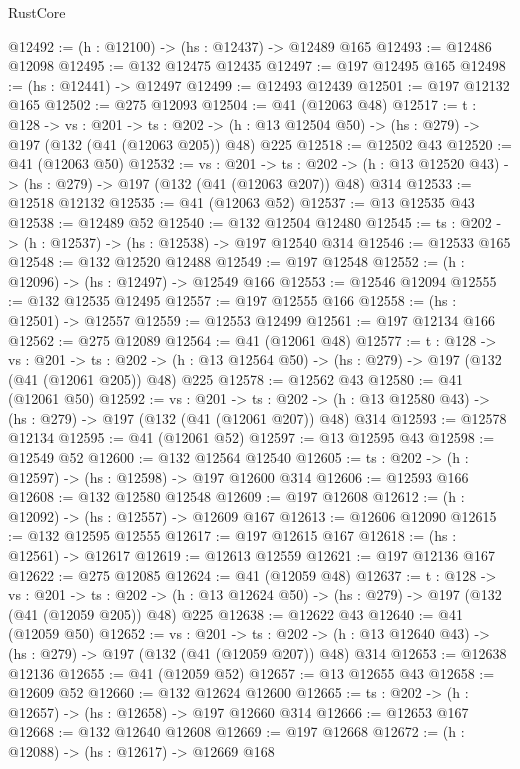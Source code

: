 \begin{lexlean}{RustCore}
\begin{coremodule}
@12492 := (h : @12100) -> (hs : @12437) -> @12489 @165
@12493 := @12486 @12098
@12495 := @132 @12475 @12435
@12497 := @197 @12495 @165
@12498 := (hs : @12441) -> @12497
@12499 := @12493 @12439
@12501 := @197 @12132 @165
@12502 := @275 @12093
@12504 := @41 (@12063 @48)
@12517 := {t : @128} ->
  {vs : @201} ->
  {ts : @202} -> (h : @13 @12504 @50) -> (hs : @279) -> @197 (@132 (@41 (@12063 @205)) @48) @225
@12518 := @12502 @43
@12520 := @41 (@12063 @50)
@12532 := {vs : @201} ->
  {ts : @202} -> (h : @13 @12520 @43) -> (hs : @279) -> @197 (@132 (@41 (@12063 @207)) @48) @314
@12533 := @12518 @12132
@12535 := @41 (@12063 @52)
@12537 := @13 @12535 @43
@12538 := @12489 @52
@12540 := @132 @12504 @12480
@12545 := {ts : @202} -> (h : @12537) -> (hs : @12538) -> @197 @12540 @314
@12546 := @12533 @165
@12548 := @132 @12520 @12488
@12549 := @197 @12548
@12552 := (h : @12096) -> (hs : @12497) -> @12549 @166
@12553 := @12546 @12094
@12555 := @132 @12535 @12495
@12557 := @197 @12555 @166
@12558 := (hs : @12501) -> @12557
@12559 := @12553 @12499
@12561 := @197 @12134 @166
@12562 := @275 @12089
@12564 := @41 (@12061 @48)
@12577 := {t : @128} ->
  {vs : @201} ->
  {ts : @202} -> (h : @13 @12564 @50) -> (hs : @279) -> @197 (@132 (@41 (@12061 @205)) @48) @225
@12578 := @12562 @43
@12580 := @41 (@12061 @50)
@12592 := {vs : @201} ->
  {ts : @202} -> (h : @13 @12580 @43) -> (hs : @279) -> @197 (@132 (@41 (@12061 @207)) @48) @314
@12593 := @12578 @12134
@12595 := @41 (@12061 @52)
@12597 := @13 @12595 @43
@12598 := @12549 @52
@12600 := @132 @12564 @12540
@12605 := {ts : @202} -> (h : @12597) -> (hs : @12598) -> @197 @12600 @314
@12606 := @12593 @166
@12608 := @132 @12580 @12548
@12609 := @197 @12608
@12612 := (h : @12092) -> (hs : @12557) -> @12609 @167
@12613 := @12606 @12090
@12615 := @132 @12595 @12555
@12617 := @197 @12615 @167
@12618 := (hs : @12561) -> @12617
@12619 := @12613 @12559
@12621 := @197 @12136 @167
@12622 := @275 @12085
@12624 := @41 (@12059 @48)
@12637 := {t : @128} ->
  {vs : @201} ->
  {ts : @202} -> (h : @13 @12624 @50) -> (hs : @279) -> @197 (@132 (@41 (@12059 @205)) @48) @225
@12638 := @12622 @43
@12640 := @41 (@12059 @50)
@12652 := {vs : @201} ->
  {ts : @202} -> (h : @13 @12640 @43) -> (hs : @279) -> @197 (@132 (@41 (@12059 @207)) @48) @314
@12653 := @12638 @12136
@12655 := @41 (@12059 @52)
@12657 := @13 @12655 @43
@12658 := @12609 @52
@12660 := @132 @12624 @12600
@12665 := {ts : @202} -> (h : @12657) -> (hs : @12658) -> @197 @12660 @314
@12666 := @12653 @167
@12668 := @132 @12640 @12608
@12669 := @197 @12668
@12672 := (h : @12088) -> (hs : @12617) -> @12669 @168

\end{coremodule}
\end{lexlean}
